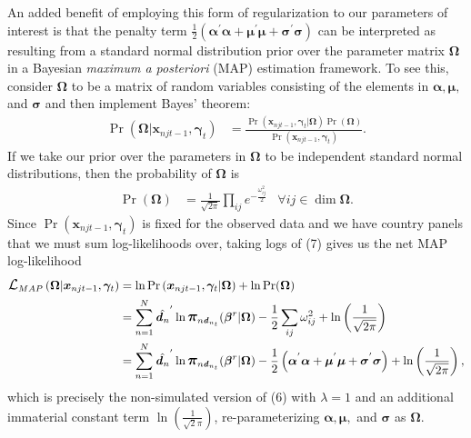\documentclass[12pt]{article}
\begin{document}
An added benefit of employing this form of regularization to our parameters of interest is that the penalty term $\frac{1}{2}\left(\boldsymbol{\alpha}^{'}\boldsymbol{\alpha} + \boldsymbol{\mu}^{'}\boldsymbol{\mu} + \boldsymbol{\sigma}^{'}\boldsymbol{\sigma}\right)$ can be interpreted as resulting from a standard normal distribution prior over the parameter matrix $\boldsymbol{\Omega}$ in a Bayesian \textit{maximum a posteriori} (MAP) estimation framework. To see this, consider $\boldsymbol{\Omega}$ to be a matrix of random variables consisting of the elements in $\boldsymbol{\alpha}, \boldsymbol{\mu},$ and $\boldsymbol{\sigma}$ and then implement Bayes' theorem:
\begin{align}
\Pr\left(\boldsymbol{\Omega}|\boldsymbol{x}_{njt-1}, \boldsymbol{\gamma}_t\right) &= 
\frac{\Pr\left(\boldsymbol{x}_{njt-1}, \boldsymbol{\gamma}_t | \boldsymbol{\Omega}\right)\Pr\left(\boldsymbol{\Omega}\right)}{\Pr\left(\boldsymbol{x}_{njt-1}, \boldsymbol{\gamma}_t\right)}.
\end{align}
If we take our prior over the parameters in $\boldsymbol{\Omega}$ to be independent standard normal distributions, then the probability of $\boldsymbol{\Omega}$ is 
\begin{align*}
\Pr(\boldsymbol{\Omega}) &= \frac{1}{\sqrt{2\pi}}\prod_{ij} e^{-\frac{\omega_{ij}^2} {2}} & \forall ij \in \dim \boldsymbol{\Omega}.
\end{align*}
Since $\Pr\left(\boldsymbol{x}_{njt-1}, \boldsymbol{\gamma}_t\right)$ is fixed for the observed data and we have country panels that we must sum log-likelihoods over, taking logs of (7) gives us the net MAP log-likelihood
\begin{align*}
\mathlarger{\mathcal{L}}_{MAP}\left(\boldsymbol{\Omega}|\boldsymbol{x}_{njt-1}, \boldsymbol{\gamma}_t\right) &= \ln \Pr\left(\boldsymbol{x}_{njt-1}, \boldsymbol{\gamma}_t | \boldsymbol{\Omega}\right) + \ln \Pr(\boldsymbol{\Omega}) \\
&= \sum\limits_{n=1}^{N} \hat{\boldsymbol{\mathit{d}}_n}^{'} \ln\mathlarger{\boldsymbol{\pi}}_{n\boldsymbol{\mathit{d}}_{n_{t}}}(\boldsymbol{\beta}^{r}|\boldsymbol{\Omega}) - \frac{1}{2} \sum\limits_{ij} \omega_{ij}^2 + \ln \left(\frac{1}{\sqrt{2\pi}}\right)\\
&= \sum\limits_{n=1}^{N} \hat{\boldsymbol{\mathit{d}}_n}^{'} \ln\mathlarger{\boldsymbol{\pi}}_{n\boldsymbol{\mathit{d}}_{n_{t}}}(\boldsymbol{\beta}^{r}|\boldsymbol{\Omega}) - \frac{1}{2}\left(\boldsymbol{\alpha}^{'}\boldsymbol{\alpha} + \boldsymbol{\mu}^{'}\boldsymbol{\mu} + \boldsymbol{\sigma}^{'}\boldsymbol{\sigma}\right) + \ln \left(\frac{1}{\sqrt{2\pi}}\right),
\end{align*}
which is precisely the non-simulated version of (6) with $\lambda = 1$ and an additional immaterial constant term $\ln \left(\frac{1}{\sqrt 2 \pi}\right)$, re-parameterizing $\boldsymbol{\alpha}, \boldsymbol{\mu},$ and $\boldsymbol{\sigma}$ as $\boldsymbol{\Omega}$.
\end{document}
